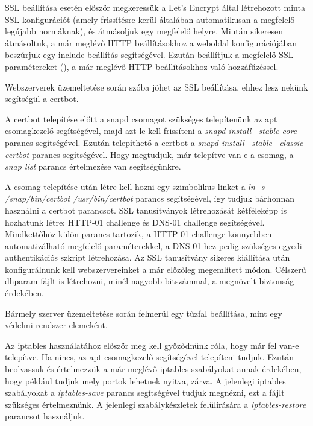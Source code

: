 SSL beállítása esetén először megkeressük a Let's Encrypt által létrehozott minta SSL konfigurációt (amely frissítésre kerül általában automatikusan a megfelelő legújabb normáknak), és átmásoljuk egy megfelelő helyre. Miután sikeresen átmásoltuk, a már meglévő HTTP beállításokhoz a weboldal konfigurációjában beszúrjuk egy include beállítás segítségével. Ezután beállítjuk a megfelelő SSL paramétereket (), a már meglévő HTTP beállításokhoz való hozzáfűzéssel.


Webszerverek üzemeltetése során szóba jöhet az SSL beállítása, ehhez lesz nekünk segítségül a certbot.

A certbot telepítése előtt a snapd csomagot szükséges telepítenünk az apt csomagkezelő segítségével, majd azt le kell frissíteni a \textit{snapd install --stable core} parancs segítségével. Ezután telepíthető a certbot a \textit{snapd install --stable --classic certbot} parancs segítségével. Hogy megtudjuk, már telepítve van-e a csomag, a \textit{snap list} parancs értelmezése van segítségünkre.

A csomag telepítése után létre kell hozni egy szimbolikus linket a \textit{ln -s /snap/bin/certbot /usr/bin/certbot} parancs segítségével, így tudjuk bárhonnan használni a certbot parancsot. SSL tanusítványok létrehozását kétféleképp is hozhatunk létre: HTTP-01 challenge és DNS-01 challenge segítségével. Mindkettőhöz külön parancs tartozik, a HTTP-01 challenge könnyebben automatizálható megfelelő paraméterekkel, a DNS-01-hez pedig szükséges egyedi authentikációs szkript létrehozása. Az SSL tanusítvány sikeres kiállítása után konfigurálnunk kell webszervereinket a már előzőleg megemlített módon. Célszerű dhparam fájlt is létrehozni, minél nagyobb bitszámmal, a megnövelt biztonság érdekében.


Bármely szerver üzemeltetése során felmerül egy tűzfal beállítása, mint egy védelmi rendszer elemeként.

Az iptables használatához először meg kell győződnünk róla, hogy már fel van-e telepítve. Ha nincs, az apt csomagkezelő segítségével telepíteni tudjuk. Ezután beolvassuk és értelmezzük a már meglévő iptables szabályokat annak érdekében, hogy például tudjuk mely portok lehetnek nyitva, zárva. A jelenlegi iptables szabályokat a \textit{iptables-save} parancs segítségével tudjuk megnézni, ezt a fájlt szükséges értelmeznünk. A jelenlegi szabálykészletek felülírására a \textit{iptables-restore} parancsot használjuk.

